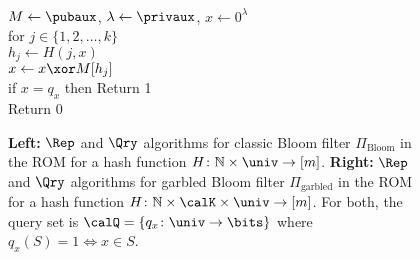 \begin{figure}[pt]
{{\medskip
{}\\
$M \gets \pubaux$, $\lambda \gets \privaux$, $x \gets 0^\lambda$\\
for $j \in \{1,2,\dots,k\}$\\
\nudge $h_j \gets H(j,x)$\\
\nudge $x \gets x \xor M[h_j]$\\
if $x = q_x$ then Return 1\\
Return 0
}
}
\caption{{\bf Left:} $\Rep$ and $\Qry$ algorithms for classic Bloom
  filter $\Pi_{\mathrm{Bloom}}$ in the ROM for a hash function $H\colon \mathbb{N} \times
  \univ \to [m]$. {\bf Right:} $\Rep$ and $\Qry$ algorithms for garbled Bloom
  filter $\Pi_{\mathrm{garbled}}$ in the ROM for a hash function $H\colon \mathbb{N} \times \calK
 \times \univ \to [m]$. For both, the query set is $\calQ=\{q_x\colon
  \univ \to \bits\}$ where $q_x(S)=1 \Leftrightarrow x \in S$.  }
\label{fig:bf-and-garbled-bf}
\end{figure}


